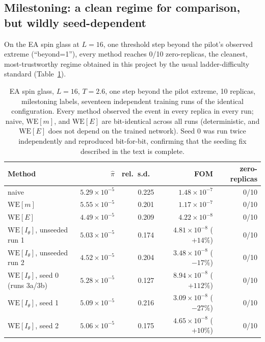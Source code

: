 \documentclass[a4paper,fleqn]{cas-sc}
\let\Oldsubsection\subsection
\renewcommand{\subsection}{\FloatBarrier\Oldsubsection}
\begin{document}
	\subsection{Milestoning: a clean regime for comparison, but wildly seed-dependent}\label{sec:milestone}
	On the EA spin glass at $L=16$, one threshold step beyond the pilot's observed extreme
	(``beyond=1''), every method reaches 0/10 zero-replicas, the cleanest,
	most-trustworthy regime obtained in this project by the usual ladder-difficulty standard
	(Table~\ref{tab:milestone}).
	
	\begin{table}[H]
		\centering\footnotesize
		\caption{EA spin glass, $L=16$, $T=2.6$, one step beyond the pilot extreme, 10 replicas,
			milestoning labels, seventeen independent training runs of the identical configuration.
			Every method observed the event in every replica in every run; naive,
			$\mathrm{WE}[m]$, and $\mathrm{WE}[E]$ are bit-identical across all runs (deterministic,
			and $\mathrm{WE}[E]$ does not depend on the trained network). Seed 0 was run twice
			independently and reproduced bit-for-bit, confirming that the seeding fix described in
			the text is complete.}
		\label{tab:milestone}
		\setlength{\tabcolsep}{4pt}
		\begin{tabular}{lrrrr}
			\toprule
			Method & $\hat\pi$ & rel.\ s.d.\ & FOM & zero-replicas \\
			\midrule
			naive & $5.29\times10^{-5}$ & 0.225 & $1.48\times10^{-7}$ & 0/10 \\
			$\mathrm{WE}[m]$ & $5.55\times10^{-5}$ & 0.201 & $1.17\times10^{-7}$ & 0/10 \\
			$\mathrm{WE}[E]$ & $4.49\times10^{-5}$ & 0.209 & $4.22\times10^{-8}$ & 0/10 \\
			$\mathrm{WE}[I_\theta]$, unseeded run 1 & $5.03\times10^{-5}$ & 0.174 &
			$4.81\times10^{-8}$ ($+14\%$) & 0/10 \\
			$\mathrm{WE}[I_\theta]$, unseeded run 2 & $4.52\times10^{-5}$ & 0.204 &
			$3.48\times10^{-8}$ ($-17\%$) & 0/10 \\
			$\mathrm{WE}[I_\theta]$, seed 0 (runs 3a/3b) & $5.28\times10^{-5}$ & 0.127 &
			$8.94\times10^{-8}$ ($+112\%$) & 0/10 \\
			$\mathrm{WE}[I_\theta]$, seed 1 & $5.09\times10^{-5}$ & 0.216 &
			$3.09\times10^{-8}$ ($-27\%$) & 0/10 \\
			$\mathrm{WE}[I_\theta]$, seed 2 & $5.06\times10^{-5}$ & 0.175 &
			$4.65\times10^{-8}$ ($+10\%$) & 0/10 \\

\end{tabular}
\end{table}
\end{document}
